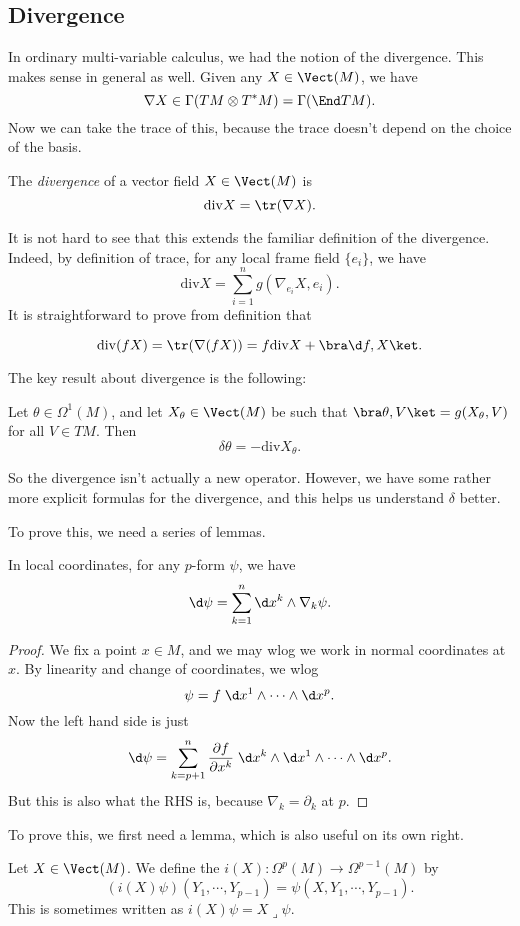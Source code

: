 \documentclass[a4paper]{article}
\renewcommand\div{\mathrm{div}}
\begin{document}
\subsection{Divergence}
In ordinary multi-variable calculus, we had the notion of the divergence. This makes sense in general as well. Given any $X \in \Vect(M)$, we have
\[
  \nabla X \in \Gamma(TM \otimes T^*M) = \Gamma(\End TM).
\]
Now we can take the trace of this, because the trace doesn't depend on the choice of the basis.
\begin{defi}[Divergence]
  The \emph{divergence} of a vector field $X \in \Vect(M)$ is
  \[
    \div X = \tr (\nabla X).
  \]
\end{defi}
It is not hard to see that this extends the familiar definition of the divergence. Indeed, by definition of trace, for any local frame field $\{e_i\}$, we have
\[
  \div X = \sum_{i = 1}^n g(\nabla_{e_i} X, e_i).
\]
It is straightforward to prove from definition that
\begin{prop}
  \[
    \div (fX) = \tr(\nabla (fX)) = f \div X + \bra \d f, X\ket.
  \]
\end{prop}
The key result about divergence is the following:
\begin{thm}
  Let $\theta \in \Omega^1(M)$, and let $X_\theta \in \Vect(M)$ be such that $\bra \theta, V\ket = g(X_\theta, V)$ for all $V \in TM$. Then
  \[
    \delta \theta = - \div X_\theta.
  \]
\end{thm}
So the divergence isn't actually a new operator. However, we have some rather more explicit formulas for the divergence, and this helps us understand $\delta$ better.

To prove this, we need a series of lemmas.
\begin{lemma}
  In local coordinates, for any $p$-form $\psi$, we have
  \[
    \d \psi = \sum_{k = 1}^n \d x^k \wedge \nabla_k \psi.
  \]
\end{lemma}

\begin{proof}
  We fix a point $x \in M$, and we may wlog we work in normal coordinates at $x$. By linearity and change of coordinates, we wlog
  \[
    \psi = f\; \d x^1 \wedge \cdots \wedge \d x^p.
  \]
  Now the left hand side is just
  \[
    \d \psi = \sum_{k = p + 1}^n \frac{\partial f}{\partial x^k}\; \d x^k \wedge \d x^1 \wedge \cdots \wedge \d x^p.
  \]
  But this is also what the RHS is, because $\nabla_k = \partial_k$ at $p$.
\end{proof}
To prove this, we first need a lemma, which is also useful on its own right.
\begin{defi}
  Let $X \in \Vect(M)$. We define the  $i(X): \Omega^p(M) \to \Omega^{p - 1}(M)$ by
  \[
    (i(X)\psi)(Y_1, \cdots, Y_{p - 1}) = \psi(X, Y_1, \cdots, Y_{p - 1}).
  \]
  This is sometimes written as $i(X) \psi = X \lrcorner \psi$.
\end{defi}
\end{document}

